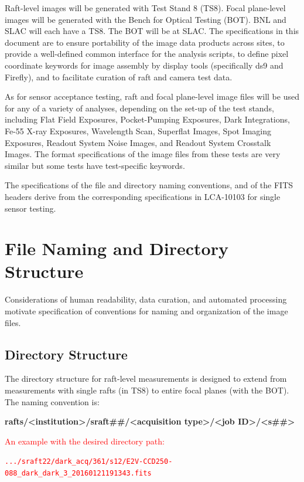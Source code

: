 \documentclass{article}[12pt]
\newcommand{\red}{\textcolor{red}}
\begin{document}
Raft-level images will be generated with Test Stand 8 (TS8).  Focal plane-level images will be generated with the Bench for Optical Testing (BOT).  BNL and SLAC will each have a TS8.  The BOT will be at SLAC.  The specifications in this document are to ensure portability of the image data products across sites, to provide a well-defined common interface for the analysis scripts, to define pixel coordinate keywords for image assembly by display tools (specifically ds9 and Firefly), and to facilitate curation of raft and camera test data.

As for sensor acceptance testing, raft and focal plane-level image files will be used for any of a variety of analyses, depending on the set-up of the test stands, including Flat Field Exposures, Pocket-Pumping Exposures, Dark Integrations, Fe-55 X-ray Exposures, Wavelength Scan, Superflat Images, Spot Imaging Exposures, Readout System Noise Images, and Readout System Crosstalk Images.
The format specifications of the image files from these tests are very similar but some tests have test-specific keywords.  

The specifications of the file and directory naming conventions, and of the FITS headers derive from the corresponding specifications in LCA-10103 for single sensor testing.

\section{File Naming and Directory Structure}
Considerations of human readability, data curation, and automated processing motivate specification of conventions for naming and organization of the image files.

\subsection{Directory Structure}

The directory structure for raft-level measurements is designed to extend from measurements with single rafts (in TS8) to entire focal planes (with the BOT).  The naming convention is:

{\bf rafts/<institution>/sraft\#\#/<acquisition type>/<job ID>/<s\#\#>}

\red{An example with the desired directory path:}

\red{{\tt .../sraft22/dark\_acq/361/s12/E2V-CCD250-088\_dark\_dark\_3\_20160121191343.fits}}

\end{document}
